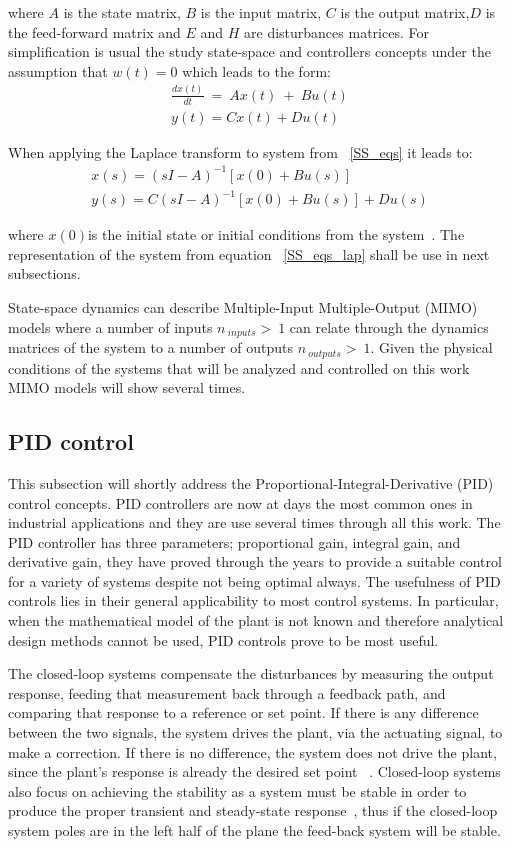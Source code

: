   where $A$ is the state matrix, $B$ is the input matrix, $C$ is the output matrix,$D$ is the feed-forward matrix and  $E$ and $H$ are disturbances matrices. For simplification is usual the study state-space and controllers concepts under the assumption that $w(t) =0$ which leads to the form:
 \smallskip
 \begin{align}
 	 \frac{dx(t)}{dt}~=~ Ax(t)~+~Bu(t)\\
 	  y(t)=Cx(t)+Du(t)
 	  \label{SS_eqs}
 \end{align}

 When applying the Laplace transform to system from ~\ref{SS_eqs} it leads to:
 \begin{align}
 	x(s)=(sI-A)^{-1}[x(0)+Bu(s)]\\
 	y(s)=C(sI-A)^{-1}[x(0)+Bu(s)]+Du(s)
 	\label{SS_eqs_lap}
 \end{align}
 
 where $x(0) $is the initial state or initial conditions from the system~\cite[Chapter ~4]{Chen1999}. The representation of the system from equation ~\ref{SS_eqs_lap} shall be use in next subsections.\smallskip
 
State-space dynamics can describe Multiple-Input Multiple-Output (MIMO) models where a number of inputs $n_{~inputs}>~1$ can relate through the dynamics  matrices of the system to a number of outputs $n_{~outputs}>~1$. Given the physical conditions of the systems that will be analyzed and controlled on this work MIMO models will show several times.


\subsection{PID control}

This subsection will shortly address the Proportional-Integral-Derivative (PID) control  concepts. PID controllers are now at days the most common ones in industrial applications and they are use several times through all this work. The PID controller has three parameters; proportional gain, integral gain, and derivative gain, they have proved through the years to provide a suitable control for a variety of systems despite not being optimal always. The usefulness of PID controls lies in their general applicability to most control systems. In particular, when the mathematical model of the plant is not known and therefore analytical design methods cannot be used, PID controls prove to be most useful.  
\smallskip

The closed-loop systems compensate the disturbances by measuring the output
response, feeding that measurement back through a feedback path, and comparing
that response to a reference or set point. If there is any difference between
the two signals, the system drives the plant, via the actuating signal, to make a
correction. If there is no difference, the system does not drive the plant, since the
plant’s response is already the desired set point ~\cite[Chapter ~1]{Nise}. Closed-loop systems also focus on achieving the stability as a system must be stable in order to produce the proper transient and steady-state response~\cite[Chapter ~3]{Nise}, thus if the closed-loop system poles are in the left half of the plane the feed-back system will be stable.
\smallskip

